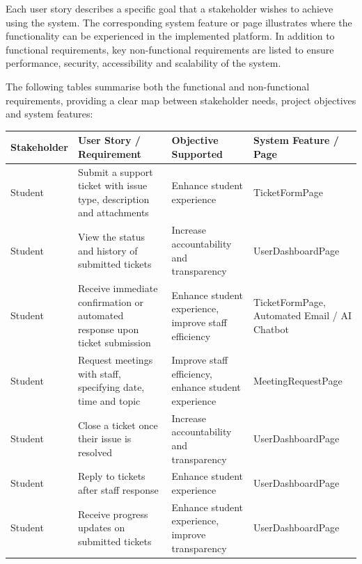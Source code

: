 Each user story describes a specific goal that a stakeholder wishes to achieve using the system. The corresponding system feature or page illustrates where the functionality can be experienced in the implemented platform. In addition to functional requirements, key non-functional requirements are listed to ensure performance, security, accessibility and scalability of the system.

The following tables summarise both the functional and non-functional requirements, providing a clear map between stakeholder needs, project objectives and system features:


\begin{table}[H]
\centering
\footnotesize
\begin{tabularx}{\textwidth}{|L|L|L|L|}
\hline

\textbf{Stakeholder} & \textbf{User Story / Requirement} & \textbf{Objective Supported} & \textbf{System Feature / Page} \\
\hline

Student & Submit a support ticket with issue type, description and attachments & Enhance student experience & TicketFormPage \\
\hline

Student & View the status and history of submitted tickets & Increase accountability and transparency & UserDashboardPage \\
\hline

Student & Receive immediate confirmation or automated response upon ticket submission & Enhance student experience, improve staff efficiency & TicketFormPage, Automated Email / AI Chatbot \\
\hline

Student & Request meetings with staff, specifying date, time and topic & Improve staff efficiency, enhance student experience & MeetingRequestPage \\
\hline

Student & Close a ticket once their issue is resolved & Increase accountability and transparency & UserDashboardPage \\
\hline

Student & Reply to tickets after staff response & Enhance student experience & UserDashboardPage \\
\hline

Student & Receive progress updates on submitted tickets & Enhance student experience, improve transparency & UserDashboardPage \\
\hline


\end{tabularx}
\end{table}
